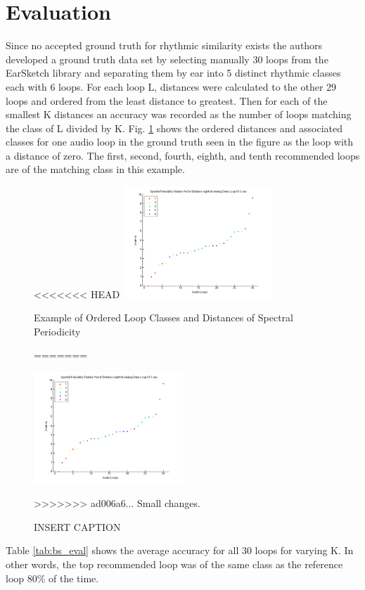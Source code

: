 \documentclass{article}
\begin{document}
\section{Evaluation}
Since no accepted ground truth for rhythmic similarity exists the authors developed a ground truth data set by selecting manually 30 loops from the EarSketch library and separating them by ear into 5 distinct rhythmic classes each with 6 loops. For each loop L, distances were calculated to the other 29 loops and ordered from the least distance to greatest. Then for each of the smallest K distances an accuracy was recorded as the number of loops matching the class of L divided by K. Fig. \ref{fig:eval1_dist} shows the ordered distances and associated classes for one audio loop in the ground truth seen in the figure as the loop with a distance of zero. The first, second, fourth, eighth, and tenth recommended loops are of the matching class in this example.

\begin{figure}[h!]
<<<<<<< HEAD
  \captionsetup{justification=centering}
    \includegraphics[width=0.5\textwidth]{distance_graph_eval1.png}
      \caption{Example of Ordered Loop Classes and Distances of Spectral Periodicity}\label{fig:eval1_dist}
=======
  \centering
   \centerline{\includegraphics[width=0.5\textwidth]{distance_graph_eval1.png}}
      \caption{INSERT CAPTION}\label{fig:eval1_dist}
>>>>>>> ad006a6... Small changes.
\end{figure}

Table \ref{tab:bs_eval} shows the average accuracy for all 30 loops for varying K. In other words, the top recommended loop was of the same class as the reference loop 80\% of the time.
\end{document}
